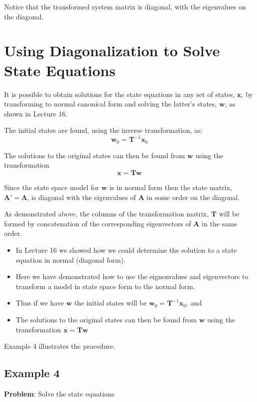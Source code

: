 Notice that the transformed system matrix is diagonal, with the eigenvalues on the diagonal.

\section*{Using Diagonalization to Solve State Equations}

It is possible to obtain solutions for the state equations in any set of states, $\mathbf{x}$, by transforming to normal canonical form and solving the latter's states, $\mathbf{w}$, as shown in Lecture 16.

The initial states are found, using the inverse transformation, as:
\[
\mathbf{w}_0=\mathbf{T}^{-1}\mathbf{x}_0
\]

The solutions to the original states can then be found from $\mathbf{w}$ using the transformation
\[
\mathbf{x}=\mathbf{Tw}
\]

Since the state space model for $\mathbf{w}$ is in normal form then the state matrix, $\mathbf{A}' = \mathbf{\Lambda}$, is diagonal with the eigenvalues of $\mathbf{A}$ in some order on the diagonal.

As demonstrated above, the columns of the transformation matrix,  $\mathbf{T}$  will be formed by concatenation of the corresponding eigenvectors of $\mathbf{A}$ in the same order.
\ifslidesonly
\begin{slide}
   \begin{itemize}
   	\item In Lecture 16 we showed how we could determine the solution to a state equation in normal (diagonal form).
   	\item Here we have demonstrated how to use the eignenvalues and eigenvectors to transform a model in state space form to the normal form.
   	\item Thus if we have $\mathbf{w}$ the initial states will be $\mathbf{w}_0=\mathbf{T}^{-1}\mathbf{x}_0$, and
   	\item The solutions to the original states can then be found from $\mathbf{w}$ using the transformation $\mathbf{x}=\mathbf{Tw}$
\end{itemize}
Example 4 illustrates the procedure.
\end{slide}
\fi

\subsection*{Example 4} %
\label{sub:example_3}
\textbf{Problem}: Solve the state equations


